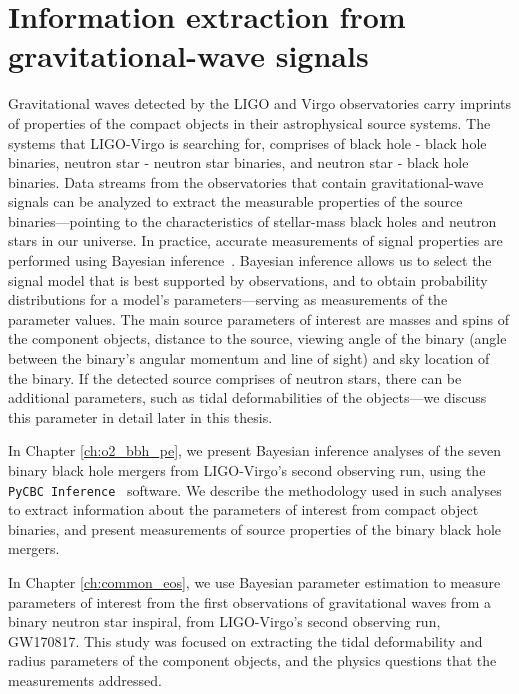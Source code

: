 \section{Information extraction from gravitational-wave signals}
Gravitational waves detected by the LIGO and Virgo observatories carry imprints of properties of the compact objects in their astrophysical source systems. The systems that LIGO-Virgo is searching for, comprises of black hole - black hole binaries, neutron star - neutron star binaries, and neutron star - black hole binaries. Data streams from the observatories that contain gravitational-wave signals can be analyzed to extract the measurable properties of the source binaries---pointing to the characteristics of stellar-mass black holes and neutron stars in our universe. In practice, accurate measurements of signal properties are performed using Bayesian inference~\cite{Bayes:1763,Jaynes:2003jaq}. Bayesian inference allows us to select the signal model that is best supported by observations, and to obtain probability distributions for a model's parameters---serving as measurements of the parameter values. The main source parameters of interest are masses and spins of the component objects, distance to the source, viewing angle of the binary (angle between the binary's angular momentum and line of sight) and sky location of the binary. If the detected source comprises of neutron stars, there can be additional parameters, such as tidal deformabilities of the objects---we discuss this parameter in detail later in this thesis. 

In Chapter \ref{ch:o2_bbh_pe}, we present Bayesian inference analyses of the seven binary black hole mergers from LIGO-Virgo's second observing run, using the \texttt{PyCBC Inference}~\cite{Biwer:2018osg} software. We describe the methodology used in such analyses to extract information about the parameters of interest from compact object binaries, and present measurements of source properties of the binary black hole mergers.

In Chapter \ref{ch:common_eos}, we use Bayesian parameter estimation to measure parameters of interest from the first observations of gravitational waves from a binary neutron star inspiral, from LIGO-Virgo's second observing run, GW170817. This study was focused on extracting the tidal deformability and radius parameters of the component objects, and the physics questions that the measurements addressed. 

